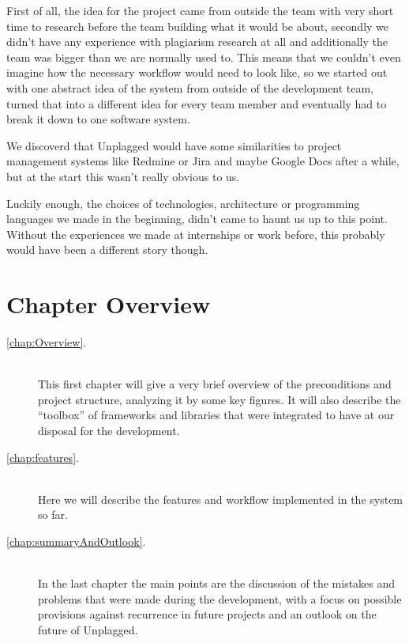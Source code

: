 First of all, the idea for the project came from outside the team with very short time to research before the team building what it would be 
about, secondly we didn't have any experience with plagiarism research at all and additionally the team was bigger than we are normally used to. 
This means that we couldn't even imagine how the necessary workflow would need to look like, so we started out with one abstract idea of the system 
from outside of the development team, turned that into a different idea for every team member and eventually had to break it down to one software system.

We discoverd that Unplagged would have some similarities to project management systems like Redmine or Jira and maybe Google Docs after a while, but at the start this wasn't really obvious to us.

Luckily enough, the choices of technologies, architecture or programming languages we made in the beginning, didn't came to haunt us up to this point. Without the experiences we made at internships or work before, this probably would have been a different story though.

\section*{Chapter Overview}

\begin{description}
\item[\ref{chap:Overview}. ] \hfill \\
This first chapter will give a very brief overview of the preconditions and project structure, analyzing it by some key figures. It will also describe the \enquote{toolbox} of
frameworks and libraries that were integrated to have at our disposal for the development.
\item[\ref{chap:features}. ] \hfill \\
Here we will describe the features and workflow implemented in the system so far.
\item[\ref{chap:summaryAndOutlook}. ] \hfill \\
In the last chapter the main points are the discussion of the mistakes and
problems that were made during the development, with a focus on possible provisions against recurrence in future projects and an
outlook on the future of Unplagged.
\end{description}


